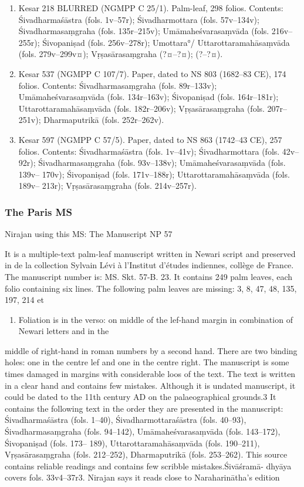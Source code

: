 \documentclass[11pt]{article}
\begin{document}
\begin{enumerate}
\item Kesar 218 BLURRED (NGMPP C 25/1). Palm-leaf, 298 folios. Contents: Śivadharmaśāstra (fols. 1v--57r);
\label{sec:org8a2ae20}
Śivadharmottara (fols. 57v--134v); Śivadharmasaṃgraha (fols.  135r--215v); Umāmaheśvarasaṃvāda (fols. 
216v--255r); Śivopaniṣad (fols. 256v--278r); Umottara°/ Uttarottaramahāsaṃvāda (fols. 279v--299v¤); 
Vṛṣasārasaṃgraha (?¤--?¤); (?--?¤).

\item Kesar 537 (NGMPP C 107/7). Paper, dated to NS 803 (1682--83 CE), 174 folios.  Contents:
\label{sec:org29bc9ef}
Śivadharmasaṃgraha (fols. 89r--133v); Umāmaheśvarasaṃvāda (fols. 134r--163v); Śivopaniṣad (fols. 
164r--181r); Uttarottaramahāsaṃvāda (fols. 182r--206v); Vṛṣasārasaṃgraha (fols. 207r--251v); Dharmaputrikā 
(fols. 252r--262v).

\item Kesar 597 (NGMPP C 57/5). Paper, dated to NS 863 (1742--43 CE), 257 folios.  Contents:
\label{sec:orgef67c2c}
Śivadharmaśāstra (fols. 1v--41v); Śivadharmottara (fols. 42v--92r); Śivadharmasaṃgraha (fols. 93v--138v); 
Umāmaheśvarasaṃvāda (fols. 139v-- 170v); Śivopaniṣad (fols. 171v--188r); Uttarottaramahāsaṃvāda (fols. 
189v-- 213r); Vṛṣasārasaṃgraha (fols. 214v--257r).
\end{enumerate}

\subsubsection{The Paris MS}
\label{sec:org7a56046}
Nirajan using this MS:
The Manuscript NP 57

It is a multiple-text palm-leaf manuscript written in Newari script and preserved in de la collection Sylvain Lévi à
l’Institut d’études indiennes, collège de France. The manuscript number is: MS. Skt. 57-B. 23. It contains 249
palm leaves, each folio containing six lines. The following palm leaves are missing: 3, 8, 47, 48, 135, 197, 214 et
\begin{enumerate}
\item Foliation is in the verso: on middle of the lef-hand margin in combination of Newari letters and in the
\end{enumerate}
middle of right-hand in roman numbers by a second hand. There are two binding holes: one in the centre lef and
one in the centre right. The manuscript is some times damaged in margins with considerable loos of the text. The
text is written in a clear hand and contains few mistakes. Although it is undated manuscript, it could be dated to
the 11th century AD on the palaeographical grounds.3 It contains the following text in the order they are
presented in the manuscript: Śivadharmaśāstra (fols. 1--40), Śivadharmottaraśāstra (fols. 40--93),
Śivadharmasaṃgraha (fols. 94--142), Umāmaheśvarasaṃvāda (fols. 143--172), Śivopaniṣad (fols. 173-- 189),
Uttarottaramahāsaṃvāda (fols. 190--211), Vṛṣasārasaṃgraha (fols. 212--252), Dharmaputrikā (fols. 253--262). This
source contains reliable readings and contains few scribble mistakes.Śivāśramā- dhyāya covers fols. 33v4--37r3.
Nirajan says it reads close to Naraharinātha's edition
\end{document}
